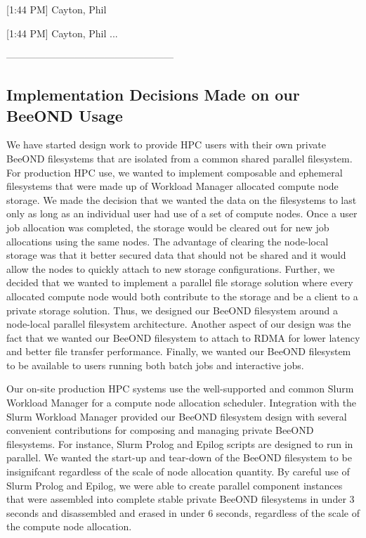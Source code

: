 [1:44 PM] Cayton, Phil
  

[1:44 PM] Cayton, Phil
...


---------------------------------------------------


\subsection{Implementation Decisions Made on our BeeOND Usage}

We have started design work to provide HPC users with their own private BeeOND filesystems that are isolated from a common shared parallel filesystem.  For production HPC use, we wanted to implement composable and ephemeral filesystems that were made up of Workload Manager allocated compute node storage.  We made the decision that we wanted the data on the filesystems to last only as long as an individual user had use of a set of compute nodes.  Once a user job allocation was completed, the storage would be cleared out for new job allocations using the same nodes.  The advantage of clearing the node-local storage was that it better secured data that should not be shared and it would allow the nodes to quickly attach to new storage configurations.  Further, we decided that we wanted to implement a parallel file storage solution where every allocated compute node would both contribute to the storage and be a client to a private storage solution.  Thus, we designed our BeeOND filesystem around a node-local parallel filesystem architecture.  Another aspect of our design was the fact that we wanted our BeeOND filesystem to attach to RDMA for lower latency and better file transfer performance.  Finally, we wanted our BeeOND filesystem to be available to users running both batch jobs and interactive jobs.  

Our on-site production HPC systems use the well-supported and common Slurm Workload Manager for a compute node allocation scheduler. Integration with the Slurm Workload Manager provided our BeeOND filesystem design with several convenient contributions for composing and managing private BeeOND filesystems.  For instance, Slurm Prolog and Epilog scripts are designed to run in parallel. We wanted the start-up and tear-down of the BeeOND filesystem to be insignifcant regardless of the scale of node allocation quantity. By careful use of Slurm Prolog and Epilog, we were able to create parallel component instances that were assembled into complete stable private BeeOND filesystems in under 3 seconds and disassembled and erased in under 6 seconds, regardless of the scale of the compute node allocation.  

